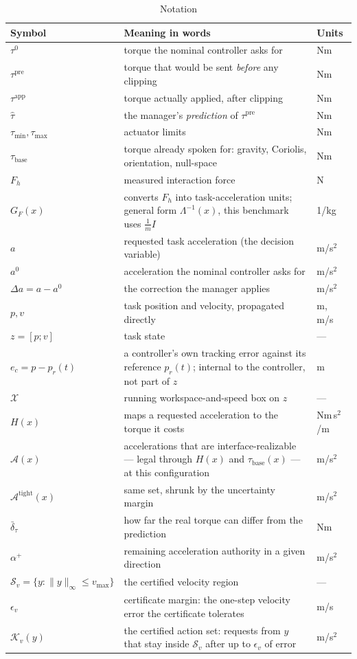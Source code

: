 \documentclass[journal]{IEEEtran}
\begin{document}
\begin{table}[t]
\caption{Notation}
\label{tab:notation}
\centering
\footnotesize
\setlength{\tabcolsep}{3pt}
\begin{tabular}{@{}p{1.65cm}p{5.05cm}p{1.0cm}@{}}
\toprule
Symbol & Meaning in words & Units \\
\midrule
$\tau^0$ & torque the nominal controller asks for & Nm \\
$\tau^{\mathrm{pre}}$ & torque that would be sent \emph{before} any clipping & Nm \\
$\tau^{\mathrm{app}}$ & torque actually applied, after clipping & Nm \\
$\hat\tau$ & the manager's \emph{prediction} of $\tau^{\mathrm{pre}}$ & Nm \\
$\tau_{\min},\tau_{\max}$ & actuator limits & Nm \\
$\tau_{\mathrm{base}}$ & torque already spoken for: gravity, Coriolis, orientation, null-space & Nm \\
$F_h$ & measured interaction force & N \\
$G_F(x)$ & converts $F_h$ into task-acceleration units; general form $\Lambda^{-1}(x)$, this benchmark uses $\tfrac1m I$ & 1/kg \\
$a$ & requested task acceleration (the decision variable) & m/s$^2$ \\
$a^{0}$ & acceleration the nominal controller asks for & m/s$^2$ \\
$\Delta a=a-a^{0}$ & the correction the manager applies & m/s$^2$ \\
$p,v$ & task position and velocity, propagated directly & m, m/s \\
$z=[p;v]$ & task state & --- \\
$e_c=p-p_r(t)$ & a controller's own tracking error against its reference $p_r(t)$; internal to the controller, not part of $z$ & m \\
$\mathcal X$ & running workspace-and-speed box on $z$ & --- \\
$H(x)$ & maps a requested acceleration to the torque it costs & Nm\,s$^2$\!/m \\
$\mathcal A(x)$ & accelerations that are interface-realizable --- legal through $H(x)$ and $\tau_{\mathrm{base}}(x)$ --- at this configuration & m/s$^2$ \\
$\mathcal A^{\mathrm{tight}}(x)$ & same set, shrunk by the uncertainty margin & m/s$^2$ \\
$\bar\delta_\tau$ & how far the real torque can differ from the prediction & Nm \\
$\alpha^{+}$ & remaining acceleration authority in a given direction & m/s$^2$ \\
$\mathcal S_v=\{y:\|y\|_\infty\le v_{\max}\}$ & the certified velocity region & --- \\
$\epsilon_v$ & certificate margin: the one-step velocity error the certificate tolerates & m/s \\
$\mathcal K_v(y)$ & the certified action set: requests from $y$ that stay inside $\mathcal S_v$ after up to $\epsilon_v$ of error & m/s$^2$ \\
\bottomrule
\end{tabular}
\end{table}
\end{document}

